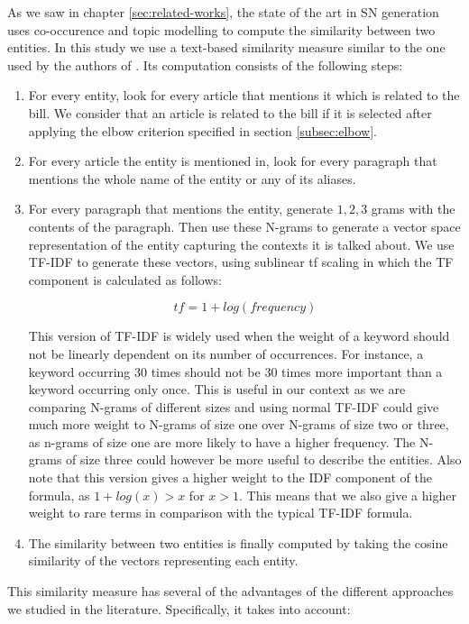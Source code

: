 As we saw in chapter \ref{sec:related-works}, the state of the art in SN generation uses co-occurence and topic modelling to compute the similarity between two entities. In this study we use a text-based similarity measure similar to the one used by the authors of \cite{policy-networks}. Its computation consists of the following steps:

\begin{enumerate}
\item For every entity, look for every article that mentions it which is related to the bill. We consider that an article is related to the bill if it is selected after applying the elbow criterion specified in section \ref{subsec:elbow}. 
\item For every article the entity is mentioned in, look for every paragraph that mentions the whole name of the entity or any of its aliases.
\item For every paragraph that mentions the entity, generate $1,2,3$ grams with the contents of the paragraph. Then use these N-grams to generate a vector space representation of the entity capturing the contexts it is talked about. We use TF-IDF to generate these vectors, using sublinear tf scaling in which the TF component is calculated as follows:

$$tf = 1+ log(frequency)$$ 

This version of TF-IDF is widely used when the weight of a keyword should not be linearly dependent on its number of occurrences. For instance, a keyword occurring 30 times should not be 30 times more important than a keyword occurring only once. This is useful in our context as we are comparing N-grams of different sizes and using normal TF-IDF could give much more weight to N-grams of size one over N-grams of size two or three, as n-grams of size one are more likely to have a higher frequency. The N-grams of size three could however be more useful to describe the entities. Also note that this version gives a higher weight to the IDF component of the formula, as $1+log(x)>x$ for $x>1$. This means that we also give a higher weight to rare terms in comparison with the typical TF-IDF formula.
\item The similarity between two entities is finally computed by taking the cosine similarity of the vectors representing each entity.  
\end{enumerate}

This similarity measure has several of the advantages of the different approaches we studied in the literature. Specifically, it takes into account:

